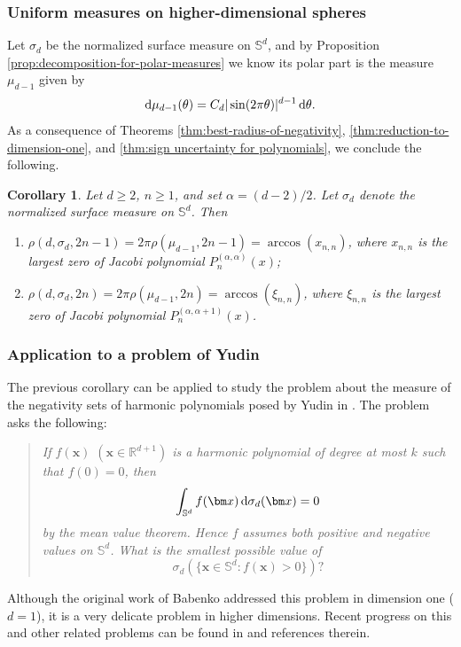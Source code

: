 \documentclass[reqno, a4paper]{amsart}
\renewcommand{\d}{\text{\rm d}}
\newcommand{\Sd}{\mathbb{S}^d}
\newcommand{\x}{{\bm x}}
\theoremstyle{plain}
\newtheorem{corollary}[theorem]{Corollary}
\theoremstyle{definition}
\theoremstyle{remarkstyle}
\numberwithin{equation}{section}
\begin{document}
\subsubsection{Uniform measures on higher-dimensional spheres}
Let $\sigma_d$ be the normalized surface measure on $\Sd$, and by Proposition \ref{prop:decomposition-for-polar-measures} we know its polar part is the measure $\mu_{d-1}$ given by 
\begin{equation}\label{eq:polar-part-of-surface-measure}
    \d\mu_{d-1}(\theta)=C_d |\sin(2\pi \theta)|^{d-1}\,\d\theta.    
\end{equation}
As a consequence of Theorems \ref{thm:best-radius-of-negativity}, \ref{thm:reduction-to-dimension-one},  and \ref{thm:sign uncertainty for polynomials}, we conclude the following. 

\begin{corollary}\label{cor:uniform-measures-on-spheres}
    Let $d \geq 2$, $n \geq 1$, and set $\alpha = (d-2)/2$. Let $\sigma_d$ denote the normalized surface measure on $\Sd$. Then
    \begin{enumerate}[label=\textnormal{(\roman*)}]
        \item $ \rho(d, \sigma_d, 2n-1)=2\pi \rho(\mu_{d-1}, 2n-1)=\arccos{(x_{n, n})}$, where $x_{n,n}$ is the largest zero of Jacobi polynomial $P^{(\alpha, \alpha)}_n(x)$;
        \smallskip
        \item $ \rho(d, \sigma_d, 2n)=2\pi \rho(\mu_{d-1}, 2n)=\arccos{(\xi_{n, n})}$, where $\xi_{n,n}$ is the largest zero of Jacobi polynomial $P^{(\alpha, \alpha+1)}_n(x)$.
    \end{enumerate}
\end{corollary}




\subsubsection{Application to a problem of Yudin}The previous corollary can be applied to study the problem about the measure of the negativity sets of harmonic polynomials posed by Yudin in \cite{YudinTwoExternalProblemsTrigonometric1996}. The problem asks the following:

\begin{quote}
\textit{If $f(\x)$ $(\x \in \mathbb{R}^{d+1})$ is a harmonic polynomial of degree at most $k$ such that $f(0) = 0$, then
\begin{equation*}
    \int_{\mathbb{S}^{d}} f(\x)\, \d\sigma_d(\x) = 0
\end{equation*}
by the mean value theorem. Hence $f$ assumes both positive and negative values on $\mathbb{S}^{d}$. What is the smallest possible value of
\begin{equation*}
\sigma_d(\{\x \in \mathbb{S}^{d} : f(\x) > 0\})?
\end{equation*}}
\end{quote}
Although the original work of Babenko \cite{Babenko1984ExtremalProblemPolynomials} addressed this problem in dimension one ($d=1$), it is a very delicate problem in higher dimensions. Recent progress on this and other related problems can be found in \cite{AndreevYudin2003PositiveValues, Yudin2004Onpositivevaluesofsphericalharmonics} and references therein.
\end{document}
